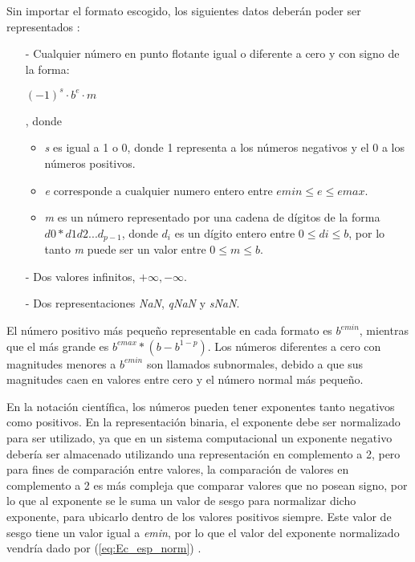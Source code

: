 Sin importar el formato escogido, los siguientes datos deberán poder ser representados \cite{IEEE754}:

\begin{itemize}
	\item[-]	Cualquier número en punto flotante igual o diferente a cero y con signo de la forma:
	\begin{center} $(-1)^{s} \cdot b^{e} \cdot m $ \end{center}, donde
	\begin{itemize}
		\item	\textit{s} es igual a 1 o 0, donde 1 representa a los números negativos y el 0 a los números positivos.
		\item	\textit{e} corresponde a cualquier numero entero entre $emin \leq e \leq emax$.
		\item	\textit{m} es un número representado por una cadena de dígitos de la forma $ d0*d1d2...d_{p-1} $, donde $ d_{i} $ es un dígito entero entre $ 0 \leq di \leq b $, por lo tanto \textit{m} puede ser un valor  entre $ 0 \leq m \leq b $.
		
	\end{itemize}
	\item[-]	Dos valores infinitos, $ +\infty,-\infty $.
	\item[-]	Dos representaciones \textit{NaN}, \textit{qNaN} y \textit{sNaN}.
\end{itemize}

El número positivo más pequeño representable en cada formato es $b^{emin}$, mientras que el más grande es $b^{emax}*(b-b^{1-p})$. Los números diferentes a cero con magnitudes menores a $b^{emin}$ son llamados subnormales, debido a que sus magnitudes caen en valores entre cero y el número normal más pequeño.

En la notación científica, los números pueden tener exponentes tanto negativos como positivos. En la representación binaria, el exponente debe ser  normalizado para ser utilizado, ya que en un sistema computacional un exponente negativo debería ser almacenado utilizando una representación en complemento a 2, pero para fines de comparación entre valores, la comparación de valores en complemento a 2 es más compleja que comparar valores que no posean signo, por lo que al exponente se le suma un valor de sesgo para normalizar dicho exponente, para ubicarlo dentro de los valores positivos siempre. Este valor de sesgo tiene un valor igual a \textit{emin}, por lo que el valor del exponente normalizado vendría dado por (\ref{eq:Ec_esp_norm})  \cite{Tesis_Diego}.

